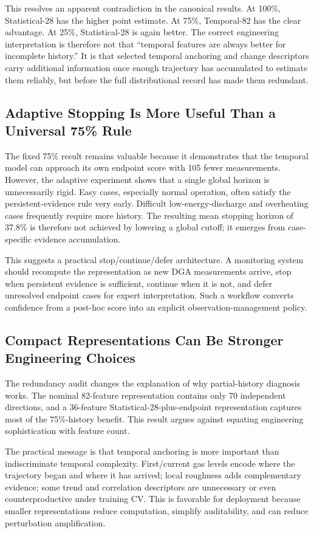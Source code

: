 \documentclass[conference]{IEEEtran}
\begin{document}
This resolves an apparent contradiction in the canonical results. At 100\%, Statistical-28 has the higher point estimate. At 75\%, Temporal-82 has the clear advantage. At 25\%, Statistical-28 is again better. The correct engineering interpretation is therefore not that ``temporal features are always better for incomplete history.'' It is that selected temporal anchoring and change descriptors carry additional information once enough trajectory has accumulated to estimate them reliably, but before the full distributional record has made them redundant.

\subsection{Adaptive Stopping Is More Useful Than a Universal 75\% Rule}
The fixed 75\% result remains valuable because it demonstrates that the temporal model can approach its own endpoint score with 105 fewer measurements. However, the adaptive experiment shows that a single global horizon is unnecessarily rigid. Easy cases, especially normal operation, often satisfy the persistent-evidence rule very early. Difficult low-energy-discharge and overheating cases frequently require more history. The resulting mean stopping horizon of 37.8\% is therefore not achieved by lowering a global cutoff; it emerges from case-specific evidence accumulation.

This suggests a practical stop/continue/defer architecture. A monitoring system should recompute the representation as new DGA measurements arrive, stop when persistent evidence is sufficient, continue when it is not, and defer unresolved endpoint cases for expert interpretation. Such a workflow converts confidence from a post-hoc score into an explicit observation-management policy.

\subsection{Compact Representations Can Be Stronger Engineering Choices}
The redundancy audit changes the explanation of why partial-history diagnosis works. The nominal 82-feature representation contains only 70 independent directions, and a 36-feature Statistical-28-plus-endpoint representation captures most of the 75\%-history benefit. This result argues against equating engineering sophistication with feature count.

The practical message is that temporal anchoring is more important than indiscriminate temporal complexity. First/current gas levels encode where the trajectory began and where it has arrived; local roughness adds complementary evidence; some trend and correlation descriptors are unnecessary or even counterproductive under training CV. This is favorable for deployment because smaller representations reduce computation, simplify auditability, and can reduce perturbation amplification.
\end{document}

